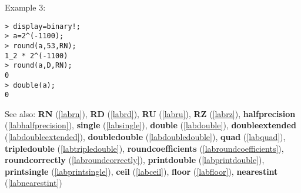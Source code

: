 \noindent Example 3: 
\begin{center}\begin{minipage}{15cm}\begin{Verbatim}[frame=single]
> display=binary!;
> a=2^(-1100);
> round(a,53,RN);
1_2 * 2^(-1100)
> round(a,D,RN);
0
> double(a);
0
\end{Verbatim}
\end{minipage}\end{center}
See also: \textbf{RN} (\ref{labrn}), \textbf{RD} (\ref{labrd}), \textbf{RU} (\ref{labru}), \textbf{RZ} (\ref{labrz}), \textbf{halfprecision} (\ref{labhalfprecision}), \textbf{single} (\ref{labsingle}), \textbf{double} (\ref{labdouble}), \textbf{doubleextended} (\ref{labdoubleextended}), \textbf{doubledouble} (\ref{labdoubledouble}), \textbf{quad} (\ref{labquad}), \textbf{tripledouble} (\ref{labtripledouble}), \textbf{roundcoefficients} (\ref{labroundcoefficients}), \textbf{roundcorrectly} (\ref{labroundcorrectly}), \textbf{printdouble} (\ref{labprintdouble}), \textbf{printsingle} (\ref{labprintsingle}), \textbf{ceil} (\ref{labceil}), \textbf{floor} (\ref{labfloor}), \textbf{nearestint} (\ref{labnearestint})
